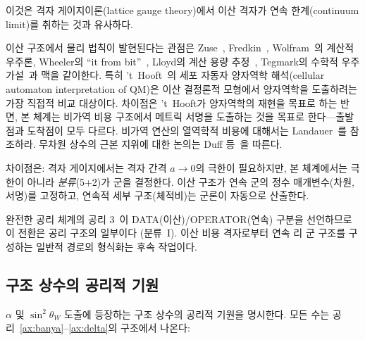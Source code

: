 \documentclass[entropy,article,submit,pdftex,oneauthor]{Definitions/mdpi}
\begin{document}
이것은 격자 게이지이론(lattice gauge theory)에서 이산 격자가 연속 한계(continuum limit)를 취하는 것과 유사하다.

이산 구조에서 물리 법칙이 발현된다는 관점은 Zuse~\cite{zuse1969}, Fredkin~\cite{fredkin2003}, Wolfram~\cite{wolfram2002}의 계산적 우주론, Wheeler의 ``it from bit''~\cite{wheeler1990}, Lloyd의 계산 용량 추정~\cite{lloyd2002}, Tegmark의 수학적 우주 가설~\cite{tegmark2008}과 맥을 같이한다. 특히 't~Hooft~\cite{thooft2016}의 세포 자동자 양자역학 해석(cellular automaton interpretation of QM)은 이산 결정론적 모형에서 양자역학을 도출하려는 가장 직접적 비교 대상이다. 차이점은 't~Hooft가 양자역학의 재현을 목표로 하는 반면, 본 체계는 비가역 비용 구조에서 메트릭 서명을 도출하는 것을 목표로 한다---출발점과 도착점이 모두 다르다. 비가역 연산의 열역학적 비용에 대해서는 Landauer~\cite{landauer1961}를 참조하라. 무차원 상수의 근본 지위에 대한 논의는 Duff 등~\cite{duff2002}을 따른다.

차이점은: 격자 게이지에서는 격자 간격 $a \to 0$의 극한이 필요하지만, 본 체계에서는 극한이 아니라 \emph{분류}(5+2)가 군을 결정한다. 이산 구조가 연속 군의 정수 매개변수(차원, 서명)를 고정하고, 연속적 세부 구조(체적비)는 군론이 자동으로 산출한다.

완전한 공리 체계의 공리 3~\cite{han2026}이 DATA(이산)/OPERATOR(연속) 구분을 선언하므로 이 전환은 공리 구조의 일부이다 (분류~I). 이산 비용 격자로부터 연속 리 군 구조를 구성하는 일반적 경로의 형식화는 후속 작업이다.

\subsection{구조 상수의 공리적 기원}

$\alpha$ 및 $\sin^2\theta_W$ 도출에 등장하는 구조 상수의 공리적 기원을 명시한다. 모든 수는 공리~\ref{ax:banya}--\ref{ax:delta}의 구조에서 나온다:
\end{document}
